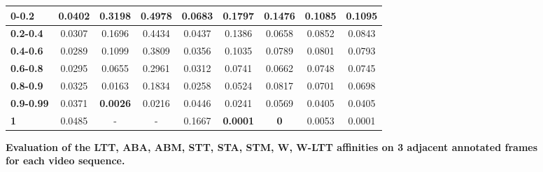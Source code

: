 \begin{figure}[htbp]
{\begin{tabular}{|l|@{ }c@{ }|@{ }c@{ }|@{ }c@{ }|@{ }c@{ }|@{ }c@{ }|@{ }c@{ }|@{ }c@{ }|@{ }c@{ }|}
\textbf{0-0.2}&0.0402&0.3198&0.4978&0.0683&0.1797&0.1476&0.1085&0.1095\\\hline
\textbf{0.2-0.4}&0.0307&0.1696&0.4434&0.0437&0.1386&0.0658&0.0852&0.0843\\\hline
\textbf{0.4-0.6}&0.0289&0.1099&0.3809&0.0356&0.1035&0.0789&0.0801&0.0793\\\hline
\textbf{0.6-0.8}&0.0295&0.0655&0.2961&0.0312&0.0741&0.0662&0.0748&0.0745\\\hline
\textbf{0.8-0.9}&0.0325&0.0163&0.1834&0.0258&0.0524&0.0817&0.0701&0.0698\\\hline
\textbf{0.9-0.99}&0.0371&\textbf{0.0026}&0.0216&0.0446&0.0241&0.0569&0.0405&0.0405\\\hline
\textbf{1}&0.0485&-&-&0.1667&\textbf{0.0001}&\textbf{0}&0.0053&0.0001\\\hline
\end{tabular}
}
\caption[Evaluation of the LTT, ABA, ABM, STT, STA, STM, W, W-LTT affinities on 3 adjacent annotated frames for each video sequence]{
{\bf Evaluation of the LTT, ABA, ABM, STT, STA, STM, W, W-LTT affinities on 3 adjacent annotated frames for each video sequence.}}
\label{fig:affin_adj}
\end{figure}

